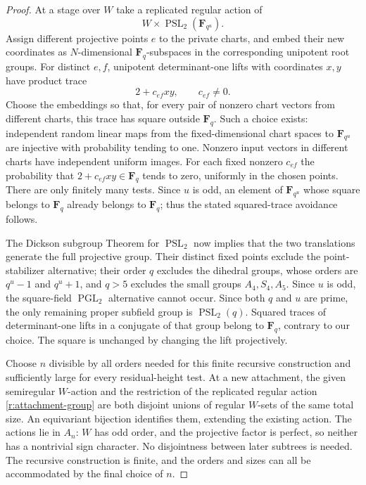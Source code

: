 \begin{proof}
At a stage over $W$ take a replicated regular action of
\begin{equation}\label{r:attachment-group}
 W\times\operatorname{PSL}_2(\mathbf F_{q^u}).
\end{equation}
Assign different projective points $e$ to the private charts, and
embed their new coordinates as $N$-dimensional $\mathbf F_q$-subspaces
in the corresponding unipotent root groups.  For distinct $e,f$,
unipotent determinant-one lifts with coordinates $x,y$ have product
trace
\[
 2+c_{ef}xy,\qquad c_{ef}\ne0.
\]
Choose the embeddings so that, for every pair of nonzero chart
vectors from different charts, this trace has square outside
$\mathbf F_q$.  Such a choice exists: independent random linear
maps from the fixed-dimensional chart spaces to $\mathbf F_{q^u}$
are injective with probability tending to one.  Nonzero input vectors
in different charts have independent uniform images.  For each
fixed nonzero $c_{ef}$ the probability that
$2+c_{ef}xy\in\mathbf F_q$ tends to zero, uniformly in the chosen
points.  There are only finitely many tests.  Since $u$ is odd, an
element of $\mathbf F_{q^u}$ whose square belongs to $\mathbf F_q$
already belongs to $\mathbf F_q$; thus the stated squared-trace
avoidance follows.

The Dickson subgroup Theorem for $\operatorname{PSL}_2$
\citep[Theorem~2.2]{Giudici2007} now implies
that the two translations generate the full projective group.
Their distinct fixed points exclude the point-stabilizer alternative;
their order $q$ excludes the dihedral groups, whose orders are
$q^u-1$ and $q^u+1$, and $q>5$ excludes the small groups
$A_4,S_4,A_5$.  Since $u$ is odd, the square-field
$\operatorname{PGL}_2$ alternative cannot occur.  Since both $q$ and
$u$ are prime, the only remaining proper subfield group is
$\operatorname{PSL}_2(q)$.  Squared traces of determinant-one lifts
in a conjugate of that group belong to $\mathbf F_q$, contrary to our choice.
The square is unchanged by changing the lift projectively.

Choose $n$ divisible by all orders needed for this finite recursive
construction and sufficiently large for every residual-height test.
At a new attachment, the given semiregular $W$-action and the
restriction of the replicated regular action
\eqref{r:attachment-group} are both disjoint unions of regular
$W$-sets of the same total size.  An equivariant bijection identifies
them, extending the existing action.  The actions lie in $A_n$:
$W$ has odd order, and the projective factor is perfect, so neither
has a nontrivial sign character.  No disjointness between later
subtrees is needed.  The recursive construction is finite, and the
orders and sizes can all be accommodated by the final choice of $n$.
\end{proof}

